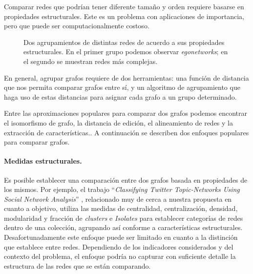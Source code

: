 Comparar redes que podrían tener diferente tamaño y orden requiere basarse en propiedades estructurales. Este es un problema con aplicaciones de importancia, pero que puede ser computacionalmente costoso. 

 \begin{figure}[htbp]
   \centering
   
    \caption{Dos agrupamientos de distintas redes de acuerdo a sus propiedades estructurales. En el primer grupo podemos observar {\it egonetworks}; en el segundo se muestran redes más complejas.}
    \label{fig:netcluster}
\end{figure}

En general, agrupar grafos requiere de dos herramientas: una función de distancia que nos permita comparar grafos entre sí, y un algoritmo de agrupamiento que haga uso de estas distancias para asignar cada grafo a un grupo determinado. 

Entre las aproximaciones populares para comparar dos grafos podemos encontrar el isomorfismo de grafo, la distancia de edición, el alineamiento de redes y la extracción de características.\cite{saxena_identifying_2019}. A continuación se describen dos enfoques populares para comparar grafos. 


\paragraph{Medidas estructurales.} Es posible establecer una comparación entre dos grafos basada en propiedades de los mismos. Por ejemplo, el trabajo \enquote{\textit{Classifying Twitter Topic-Networks Using Social Network Analysis}} \cite{himelboim_classifying_2017}, relacionado muy de cerca a nuestra propuesta en cuanto a objetivo, utiliza las medidas de centralidad, centralización, densidad, modularidad y fracción de \textit{clusters} e \textit{Isolates} para establecer categorías de redes dentro de una colección, agrupando así conforme a características estructurales. Desafortunadamente este enfoque puede ser limitado en cuanto a la distinción que establece entre redes. Dependiendo de los indicadores considerados y del contexto del problema, el enfoque podría no capturar con suficiente detalle la estructura de las redes que se están comparando. 

